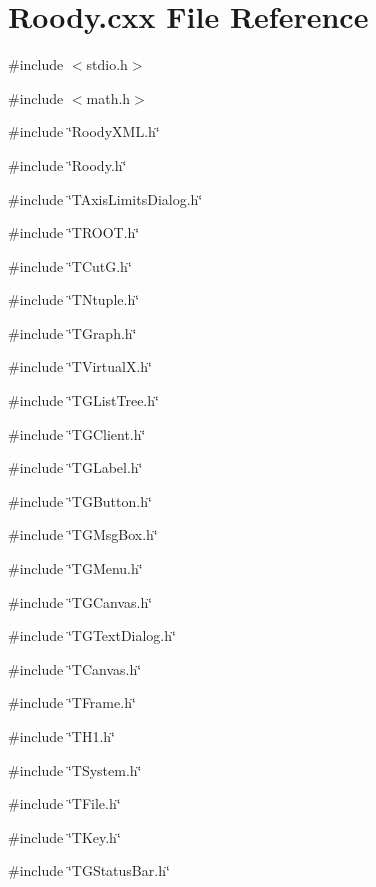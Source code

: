 \section{Roody.cxx File Reference}
\label{Roody_8cxx}
{\ttfamily \#include $<$stdio.h$>$}\par
{\ttfamily \#include $<$math.h$>$}\par
{\ttfamily \#include \char`\"{}RoodyXML.h\char`\"{}}\par
{\ttfamily \#include \char`\"{}Roody.h\char`\"{}}\par
{\ttfamily \#include \char`\"{}TAxisLimitsDialog.h\char`\"{}}\par
{\ttfamily \#include \char`\"{}TROOT.h\char`\"{}}\par
{\ttfamily \#include \char`\"{}TCutG.h\char`\"{}}\par
{\ttfamily \#include \char`\"{}TNtuple.h\char`\"{}}\par
{\ttfamily \#include \char`\"{}TGraph.h\char`\"{}}\par
{\ttfamily \#include \char`\"{}TVirtualX.h\char`\"{}}\par
{\ttfamily \#include \char`\"{}TGListTree.h\char`\"{}}\par
{\ttfamily \#include \char`\"{}TGClient.h\char`\"{}}\par
{\ttfamily \#include \char`\"{}TGLabel.h\char`\"{}}\par
{\ttfamily \#include \char`\"{}TGButton.h\char`\"{}}\par
{\ttfamily \#include \char`\"{}TGMsgBox.h\char`\"{}}\par
{\ttfamily \#include \char`\"{}TGMenu.h\char`\"{}}\par
{\ttfamily \#include \char`\"{}TGCanvas.h\char`\"{}}\par
{\ttfamily \#include \char`\"{}TGTextDialog.h\char`\"{}}\par
{\ttfamily \#include \char`\"{}TCanvas.h\char`\"{}}\par
{\ttfamily \#include \char`\"{}TFrame.h\char`\"{}}\par
{\ttfamily \#include \char`\"{}TH1.h\char`\"{}}\par
{\ttfamily \#include \char`\"{}TSystem.h\char`\"{}}\par
{\ttfamily \#include \char`\"{}TFile.h\char`\"{}}\par
{\ttfamily \#include \char`\"{}TKey.h\char`\"{}}\par
{\ttfamily \#include \char`\"{}TGStatusBar.h\char`\"{}}\par

